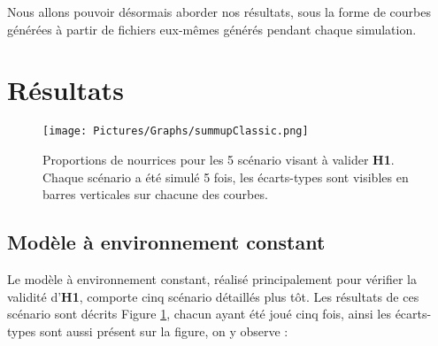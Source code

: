 		Nous allons pouvoir désormais aborder nos résultats, sous la forme de courbes générées à partir de fichiers eux-mêmes générés pendant chaque simulation. 
		
			
			
	\section{Résultats}
	
	\begin{figure}
	\centering
	\texttt{[image: Pictures/Graphs/summupClassic.png]}
	\caption[Proportions de nourrices pour les 5 scénario visant à valider \textbf{H1}.]{Proportions de nourrices pour les 5 scénario visant à valider \textbf{H1}. Chaque scénario a été simulé 5 fois, les écarts-types sont visibles en barres verticales sur chacune des courbes.}
	\label{envConstant}
	\end{figure}
	
	\subsection{Modèle à environnement constant}
	
	Le modèle à environnement constant, réalisé principalement pour vérifier la validité d'\textbf{H1}, comporte cinq scénario détaillés plus tôt. Les résultats de ces scénario sont décrits Figure \ref{envConstant}, chacun ayant été joué cinq fois, ainsi les écarts-types sont aussi présent sur la figure, on y observe :
	
